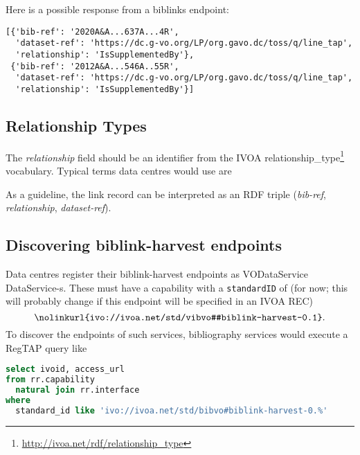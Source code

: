 \documentclass[11pt,a4paper]{ivoa}
\def\vocterm#1{\textit{\color{termcolor}#1}}
\def\vocterm{\startvocterm\realvocterm}
\def\realvocterm#1{\textit{\color{termcolor}#1}\endvocterm}
\gdef\breakablecolon{:\hskip0pt}
\gdef\startvocterm{\begingroup
  \catcode`\:=\active\let:=\breakablecolon}
\gdef\endvocterm{\endgroup}
\begin{document}
Here is a possible response from a biblinks endpoint:

\begin{lstlisting}[basicstyle=\footnotesize]
[{'bib-ref': '2020A&A...637A...4R',
  'dataset-ref': 'https://dc.g-vo.org/LP/org.gavo.dc/toss/q/line_tap',
  'relationship': 'IsSupplementedBy'},
 {'bib-ref': '2012A&A...546A..55R',
  'dataset-ref': 'https://dc.g-vo.org/LP/org.gavo.dc/toss/q/line_tap',
  'relationship': 'IsSupplementedBy'}]
\end{lstlisting}


\subsection{Relationship Types}

The \textit{relationship} field should be an identifier from the IVOA
relationship\_type\footnote{\url{http://ivoa.net/rdf/relationship_type}}
vocabulary.  Typical terms data centres would use are


As a guideline, the link record can be interpreted as an RDF triple
(\textit{bib-ref}, \textit{relationship}, \textit{dataset-ref}).


\subsection{Discovering biblink-harvest endpoints}

Data centres register their biblink-harvest endpoints as VODataService
\citep{2021ivoa.spec.1102D} DataService-s.  These must have a capability
with a \verb|standardID| of (for now; this will probably change if this
endpoint will be specified in an IVOA REC)
$$\hbox{\nolinkurl{ivo://ivoa.net/std/vibvo#biblink-harvest-0.1}}.$$
To discover the endpoints of such services, bibliography services would
execute a RegTAP query like

\begin{lstlisting}[language=SQL,basicstyle=\footnotesize\ttfamily]
select ivoid, access_url
from rr.capability
  natural join rr.interface
where
  standard_id like 'ivo://ivoa.net/std/bibvo#biblink-harvest-0.%'
\end{lstlisting}
\end{document}

